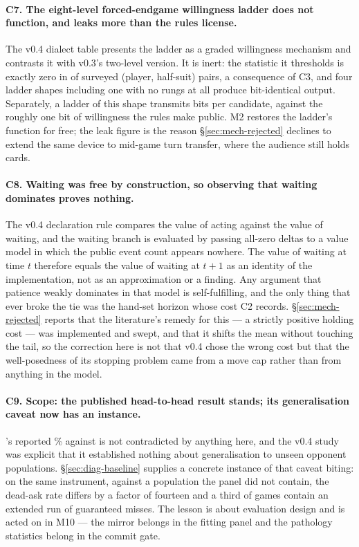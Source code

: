 \paragraph{C7. The eight-level forced-endgame willingness ladder does not
function, and leaks more than the rules license.} The v0.4 dialect table presents
the ladder as a graded willingness mechanism and contrasts it with v0.3's
two-level version. It is inert: the statistic it thresholds is exactly zero in
\numRungZeroPairs{} of \numRungZeroPairs{} surveyed (player, half-suit) pairs, a
consequence of C3, and four ladder shapes including one with no rungs at all
produce bit-identical output. Separately, a ladder of this shape transmits
\numLadderLeak{} bits per candidate, against the roughly one bit of willingness
the rules make public. M2 restores the ladder's function for free; the leak
figure is the reason \S\ref{sec:mech-rejected} declines to extend the same device
to mid-game turn transfer, where the audience still holds cards.

\paragraph{C8. Waiting was free by construction, so observing that waiting
dominates proves nothing.} The v0.4 declaration rule compares the value of acting
against the value of waiting, and the waiting branch is evaluated by passing
all-zero deltas to a value model in which the public event count appears nowhere.
The value of waiting at time $t$ therefore equals the value of waiting at $t+1$
as an identity of the implementation, not as an approximation or a finding. Any
argument that patience weakly dominates in that model is self-fulfilling, and the
only thing that ever broke the tie was the hand-set horizon whose cost C2
records. \S\ref{sec:mech-rejected} reports that the literature's remedy for this
--- a strictly positive holding cost --- was implemented and swept, and that it
shifts the mean without touching the tail, so the correction here is not that
v0.4 chose the wrong cost but that the well-posedness of its stopping problem
came from a move cap rather than from anything in the model.

\paragraph{C9. Scope: the published head-to-head result stands; its
generalisation caveat now has an instance.} \vfour{}'s reported
\numVfourVsVthree\% against \vthree{} is not contradicted by anything here, and
the v0.4 study was explicit that it established nothing about generalisation to
unseen opponent populations. \S\ref{sec:diag-baseline} supplies a concrete
instance of that caveat biting: on the same instrument, against a population the
panel did not contain, the dead-ask rate differs by a factor of fourteen and a
third of games contain an extended run of guaranteed misses. The lesson is about
evaluation design and is acted on in M10 --- the mirror belongs in the fitting
panel and the pathology statistics belong in the commit gate.
